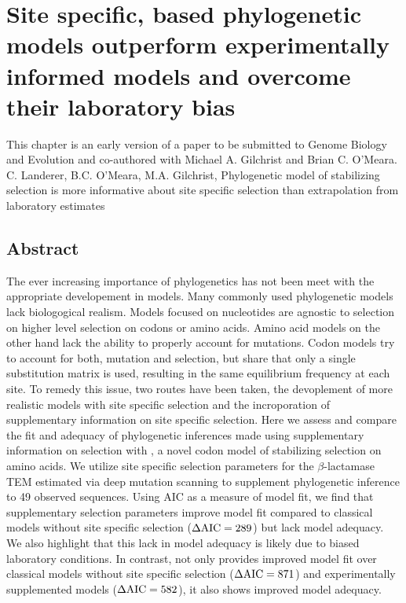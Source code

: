 \chapter{Site specific, \PC based phylogenetic models outperform experimentally informed models and overcome their laboratory bias} 
\label{ch:phylogeny}

\clearpage
\pagebreak

This chapter is an early version of a paper to be submitted to Genome Biology and Evolution and co-authored with Michael A. Gilchrist and Brian C. O'Meara.\\
\newline
\newline
C. Landerer, B.C. O'Meara, M.A. Gilchrist, Phylogenetic model of stabilizing selection is more informative about site specific selection than extrapolation from laboratory estimates

\section{Abstract}
The ever increasing importance of phylogenetics has not been meet with the appropriate developement in models.
Many commonly used phylogenetic models lack biologogical realism.
Models focused on nucleotides are agnostic to selection on higher level selection on codons or amino acids.
Amino acid models on the other hand lack the ability to properly account for mutations.
Codon models try to account for both, mutation and selection, but share that only a single substitution matrix is used, resulting in the same equilibrium frequency at each site.
To remedy this issue, two routes have been taken, the devoplement of more realistic models with site specific selection and the incroporation of supplementary information on site specific selection.
Here we assess and compare the fit and adequacy of phylogenetic inferences made using supplementary information on selection with \selac, a novel codon model of stabilizing selection on amino acids.
We utilize site specific selection parameters for the $\beta$-lactamase TEM estimated via deep mutation scanning to supplement phylogenetic inference to 49 observed sequences.
Using AIC as a measure of model fit, we find that supplementary selection parameters improve model fit compared to classical models without site specific selection ($\Delta\text{AIC} = 289$) but lack model adequacy.
We also highlight that this lack in model adequacy is likely due to biased laboratory conditions.
In contrast, \selac not only provides improved model fit over classical models without site specific selection ($\Delta\text{AIC} = 871$) and experimentally supplemented models ($\Delta\text{AIC} = 582$), it also shows improved model adequacy.
\newpage


